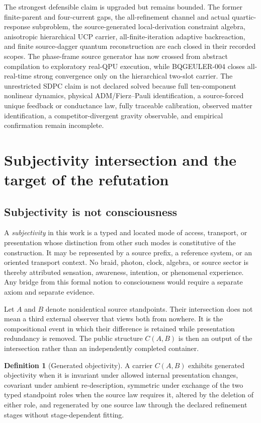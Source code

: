 \documentclass[11pt]{article}
\theoremstyle{definition}
\newtheorem{definition}[theorem]{Definition}
\theoremstyle{remark}
\begin{document}
The strongest defensible claim is upgraded but remains bounded. The former finite-parent and four-current gaps, the all-refinement channel and actual quartic-response subproblem, the source-generated local-derivation constraint algebra, anisotropic hierarchical UCP carrier, all-finite-iteration adaptive backreaction, and finite source-dagger quantum reconstruction are each closed in their recorded scopes. The phase-frame source generator has now crossed from abstract compilation to exploratory real-QPU execution, while BQGEULER-004 closes all-real-time strong convergence only on the hierarchical two-slot carrier. The unrestricted SDPC claim is not declared solved because full ten-component nonlinear dynamics, physical ADM/Fierz--Pauli identification, a source-forced unique feedback or conductance law, fully traceable calibration, observed matter identification, a competitor-divergent gravity observable, and empirical confirmation remain incomplete.

\section{Subjectivity intersection and the target of the refutation}

\subsection{Subjectivity is not consciousness}

A \emph{subjectivity} in this work is a typed and located mode of access, transport, or presentation whose distinction from other such modes is constitutive of the construction. It may be represented by a source prefix, a reference system, or an oriented transport context. No braid, photon, clock, algebra, or source sector is thereby attributed sensation, awareness, intention, or phenomenal experience. Any bridge from this formal notion to consciousness would require a separate axiom and separate evidence.

Let $A$ and $B$ denote nonidentical source standpoints. Their intersection does not mean a third external observer that views both from nowhere. It is the compositional event in which their difference is retained while presentation redundancy is removed. The public structure $C(A,B)$ is then an output of the intersection rather than an independently completed container.

\begin{definition}[Generated objectivity]
A carrier $C(A,B)$ exhibits generated objectivity when it is invariant under allowed internal presentation changes, covariant under ambient re-description, symmetric under exchange of the two typed standpoint roles when the source law requires it, altered by the deletion of either role, and regenerated by one source law through the declared refinement stages without stage-dependent fitting.
\end{definition}
\end{document}
